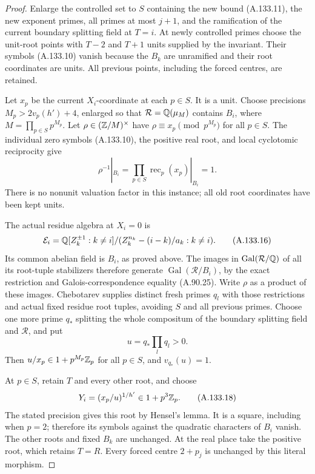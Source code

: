\begin{proof}
Enlarge the controlled set to \(S\) containing the
new bound (A.133.11), the new exponent primes,
all primes at most \(j+1\), and the ramification
of the current boundary splitting field at \(T=i\).
At newly controlled primes choose the unit-root
points with \(T-2\) and \(T+1\) units supplied by the invariant.
Their symbols (A.133.10) vanish because the \(B_k\)
are unramified and their root coordinates are units.
All previous points, including the forced centres,
are retained.

Let \(x_p\) be the current \(X_i\)-coordinate at
each \(p\in S\).  It is a unit.
Choose precisions \(M_p>2v_p(h')+4\), enlarged so
that \(\mathcal R=\mathbb Q(\mu_M)\) contains \(B_i\), where
\(M=\prod_{p\in S}p^{M_p}\).
Let \(\rho\in(\mathbb Z/M)^\times\) have
\(\rho\equiv x_p\pmod{p^{M_p}}\) for all \(p\in S\).
The individual zero symbols (A.133.10), the positive
real root, and local cyclotomic reciprocity give
\[
          \rho^{-1}|_{B_i}
             =\prod_{p\in S}\operatorname{rec}_p(x_p)|_{B_i}
             =1.
\tag{A.133.15}
\]
There is no nonunit valuation factor in this instance;
all old root coordinates have been kept units.

The actual residue algebra at \(X_i=0\) is
\[
 \mathcal E_i=
   \mathbb Q[Z_k^{\pm1}:k\ne i]/
          (Z_k^{n_k}-(i-k)/a_k:k\ne i).
\tag{A.133.16}
\]
Its common abelian field is \(B_i\), as proved above.
The images in \(\operatorname{Gal}(\mathcal R/\mathbb Q)\)
of all its root-tuple stabilizers therefore generate
\(\operatorname{Gal}(\mathcal R/B_i)\), by the exact
restriction and Galois-correspondence equality
(A.90.25).
Write \(\rho\) as a product of these images.
Chebotarev supplies distinct fresh primes \(q_l\)
with those restrictions and actual fixed residue
root tuples, avoiding \(S\) and all previous primes.
Choose one more prime \(q_*\) splitting the whole
compositum of the boundary splitting field and
\(\mathcal R\), and put
\[
                         u=q_*\prod_lq_l>0.
\tag{A.133.17}
\]
Then \(u/x_p\in1+p^{M_p}\mathbb Z_p\) for all \(p\in S\),
and \(v_{q_*}(u)=1\).

At \(p\in S\), retain \(T\) and every other root,
and choose
\[
                    Y_i=(x_p/u)^{1/h'}\in1+p^3\mathbb Z_p.
\tag{A.133.18}
\]
The stated precision gives this root by Hensel's
lemma.  It is a square, including when \(p=2\);
therefore its symbols against the quadratic
characters of \(B_i\) vanish.
The other roots and fixed \(B_k\) are unchanged.
At the real place take the positive root, which
retains \(T=R\).
Every forced centre \(2+p_j\) is unchanged by this
literal morphism.


\end{proof}
